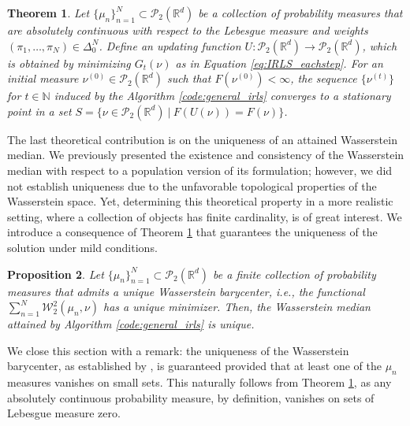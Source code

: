 \documentclass[11pt]{article}
\newcommand{\calP}{\mathcal{P}}
\newcommand{\calW}{\mathcal{W}}
\newcommand{\bbR}{\mathbb{R}}
\newcommand{\bbN}{\mathbb{N}}
\newtheorem{theorem}{Theorem}
\newtheorem{proposition}[theorem]{Proposition}
\begin{document}
\begin{theorem}\label{thm:IRLS_convergence}
	Let $\lbrace \mu_n\rbrace_{n=1}^N \subset \calP_2 (\bbR^d)$ be a collection of probability measures that are absolutely continuous with respect to the Lebesgue measure and  weights $(\pi_1,\ldots,\pi_N) \in \Delta_0^N$. Define an updating function $U:\calP_2(\mathbb{R}^d) \rightarrow \calP_2(\mathbb{R}^d)$, which is obtained by minimizing $G_t (\nu)$ as in Equation \eqref{eq:IRLS_eachstep}. 	For an initial measure $\nu^{(0)}\in \calP_2 (\bbR^d)$ such that $F(\nu^{(0)}) < \infty$, the sequence $\lbrace \nu^{(t)}\rbrace$ for $t\in\bbN$  induced by the Algorithm \ref{code:general_irls} converges to a stationary point in a set $S = \lbrace \nu\in\calP_2(\bbR^d)~|~ F(U(\nu)) = F(\nu)\rbrace$.
\end{theorem}


The last theoretical contribution is on the uniqueness of an attained Wasserstein median. We previously presented the existence and consistency of the Wasserstein median with respect to a population version of its formulation; however, we did not establish uniqueness due to the unfavorable topological properties of the Wasserstein space. Yet, determining this theoretical property in a more realistic setting, where a collection of objects has finite cardinality, is of great interest. We introduce a consequence of Theorem \ref{thm:IRLS_convergence} that guarantees the uniqueness of the solution under mild conditions.

\begin{proposition}\label{thm:FiniteUniqueness}
	Let $\lbrace \mu_n \rbrace_{n=1}^N \subset \calP_2(\bbR^d)$ be a finite collection of probability measures that admits a unique Wasserstein barycenter, i.e., the functional $\sum_{n=1}^N \calW_2^2 (\mu_n, \nu)$ has a unique minimizer. Then, the Wasserstein median attained by Algorithm \ref{code:general_irls} is unique. 
\end{proposition}



We close this section with a remark: the uniqueness of the Wasserstein barycenter, as established by \cite{agueh_2011_BarycentersWassersteinSpace, legouic_2017_ExistenceConsistencyWasserstein}, is guaranteed provided that at least one of the $\mu_n$ measures vanishes on small sets. This naturally follows from Theorem \ref{thm:IRLS_convergence}, as any absolutely continuous probability measure, by definition, vanishes on sets of Lebesgue measure zero.
\end{document}

